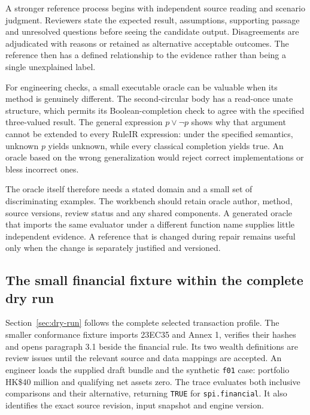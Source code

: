 A stronger reference process begins with independent source reading and scenario
judgment. Reviewers state the expected result, assumptions, supporting passage
and unresolved questions before seeing the candidate output. Disagreements are
adjudicated with reasons or retained as alternative acceptable outcomes. The
reference then has a defined relationship to the evidence rather than being a
single unexplained label.


For engineering checks, a small executable oracle can be valuable when its method
is genuinely different. The second-circular body has a read-once unate structure,
which permits its Boolean-completion check to agree with the specified
three-valued result. The general expression $p\lor\neg p$ shows why that argument
cannot be extended to every RuleIR expression: under the specified semantics,
unknown $p$ yields unknown, while every classical completion yields true.
An oracle based on the wrong generalization would reject correct implementations
or bless incorrect ones.

The oracle itself therefore needs a stated domain and a small set of discriminating
examples. The workbench should retain oracle author, method, source versions,
review status and any shared components. A generated oracle that imports the same
evaluator under a different function name supplies little independent evidence.
A reference that is changed during repair remains useful only when the change is
separately justified and versioned.

\subsection{The small financial fixture within the complete dry run}
\label{merge:P-03c-storage-review:01}


Section~\ref{sec:dry-run} follows the complete selected transaction profile.
The smaller conformance fixture imports 23EC35 and Annex 1, verifies their hashes and
opens paragraph 3.1 beside the financial rule. Its two wealth definitions are
review issues until the relevant source and data mappings are accepted. An
engineer loads the supplied draft bundle and the synthetic \texttt{f01} case:
portfolio HK\$40 million and qualifying net assets zero. The trace evaluates
both inclusive comparisons and their alternative, returning \texttt{TRUE} for
\texttt{spi.financial}. It also identifies the exact source revision, input
snapshot and engine version.

